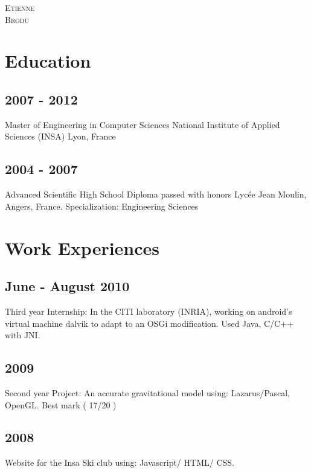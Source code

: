 


\pagestyle{empty}

	{
		\LARGE{\textsc{Etienne}\\
				\textsc{Brodu}}
	}
	
	
	
\section{Education}
	\subsection{2007 - 2012}
		{Master of Engineering in Computer Sciences National Institute of Applied Sciences (INSA) Lyon, France}
		
	\subsection{2004 - 2007}
		{Advanced Scientific High School Diploma passed with honors Lyc\'{e}e Jean Moulin, Angers, France. Specialization: Engineering Sciences}

\section{Work Experiences}
	\subsection{June - August 2010}
		{Third year Internship: In the CITI laboratory (INRIA), working on android's virtual machine dalvik to adapt to an OSGi modification. Used Java, C/C++ with JNI.}

	\subsection{2009}
		{Second year Project: An accurate gravitational model using: Lazarus/Pascal, OpenGL. Best mark ( 17/20 )}
		
	\subsection{2008}
		{Website for the Insa Ski club using: Javascript/ HTML/ CSS.}
				
